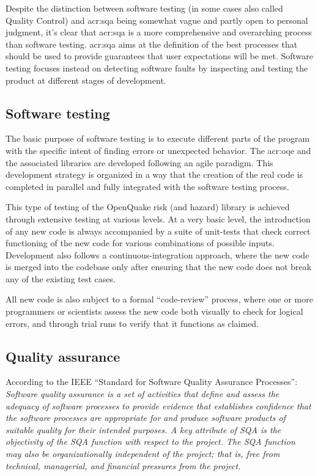 Despite the distinction between software testing (in some cases also called Quality Control) and \gls{acr:sqa} being somewhat vague and partly open to personal judgment, it's clear that \gls{acr:sqa} is a more comprehensive and overarching process than software testing.
%
\gls{acr:sqa} aims at the definition of the best processes that should be used to provide guarantees that user expectations will be met.
%
Software testing focuses instead on detecting software faults by inspecting and testing the product at different stages of development.

\subsection{Software testing}
The basic purpose of software testing is to execute different parts of the program with the specific intent of finding errors or unexpected behavior.
%
The \gls{acr:oqe} and the associated libraries are developed following an agile paradigm. This development strategy is organized in a way that the creation of the real code is completed in parallel and fully integrated with the software testing process.

This type of testing of the OpenQuake risk (and hazard) library is achieved through extensive testing at various levels. At a very basic level, the introduction of any new code is always accompanied by a suite of unit-tests that check correct functioning of the new code for various combinations of possible inputs. Development also follows a continuous-integration approach, where the new code is merged into the codebase only after ensuring that the new code does not break any of the existing test cases.

All new code is also subject to a formal ``code-review'' process, where one or more programmers or scientists assess the new code both visually to check for logical errors, and through trial runs to verify that it functions as claimed.

\subsection{Quality assurance}
According to the IEEE ``Standard for Software Quality Assurance Processes'':
\emph{Software quality assurance is a set of activities that define and assess the adequacy of software processes to provide evidence that establishes confidence that the software processes are appropriate for and produce software products of suitable quality for their intended purposes. A key attribute of SQA is the objectivity of the SQA function with respect to the project. The SQA function may also be organizationally independent of the project; that is, free from technical, managerial, and financial pressures from the project.}

